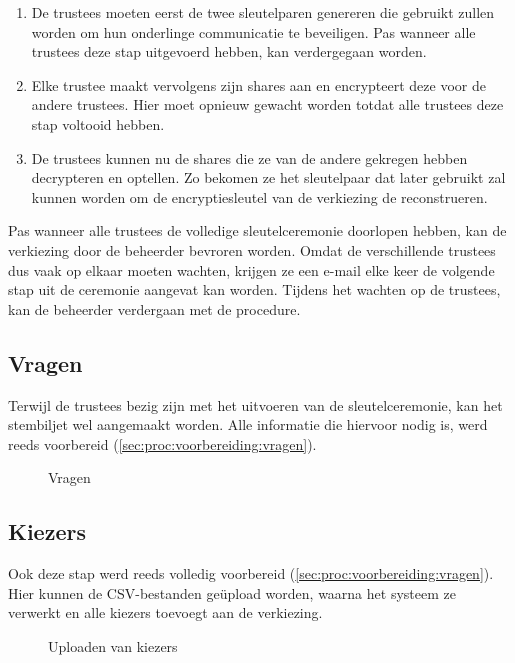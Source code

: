 \begin{enumerate}
  \item De trustees moeten eerst de twee sleutelparen genereren die gebruikt zullen worden om hun onderlinge communicatie te beveiligen. Pas wanneer alle trustees deze stap uitgevoerd hebben, kan verdergegaan worden.
  \item Elke trustee maakt vervolgens zijn shares aan en encrypteert deze voor de andere trustees. Hier moet opnieuw gewacht worden totdat alle trustees deze stap voltooid hebben.
  \item De trustees kunnen nu de shares die ze van de andere gekregen hebben decrypteren en optellen. Zo bekomen ze het sleutelpaar dat later gebruikt zal kunnen worden om de encryptiesleutel van de verkiezing de reconstrueren.
\end{enumerate}

Pas wanneer alle trustees de volledige sleutelceremonie doorlopen hebben, kan de verkiezing door de beheerder bevroren worden. Omdat de verschillende trustees dus vaak op elkaar moeten wachten, krijgen ze een e-mail elke keer de volgende stap uit de ceremonie aangevat kan worden. Tijdens het wachten op de trustees, kan de beheerder verdergaan met de procedure.

\subsection{Vragen}

Terwijl de trustees bezig zijn met het uitvoeren van de sleutelceremonie, kan het stembiljet wel aangemaakt worden. Alle informatie die hiervoor nodig is, werd reeds voorbereid (\ref{sec:proc:voorbereiding:vragen}).

\begin{figure}
  \caption{Vragen}
  \label{fig:proc:questions}
\end{figure}

\subsection{Kiezers}

Ook deze stap werd reeds volledig voorbereid (\ref{sec:proc:voorbereiding:vragen}). Hier kunnen de CSV-bestanden ge\"upload worden, waarna het systeem ze verwerkt en alle kiezers toevoegt aan de verkiezing.

\begin{figure}
  \caption{Uploaden van kiezers}
  \label{fig:proc:voters_upload}
\end{figure}

